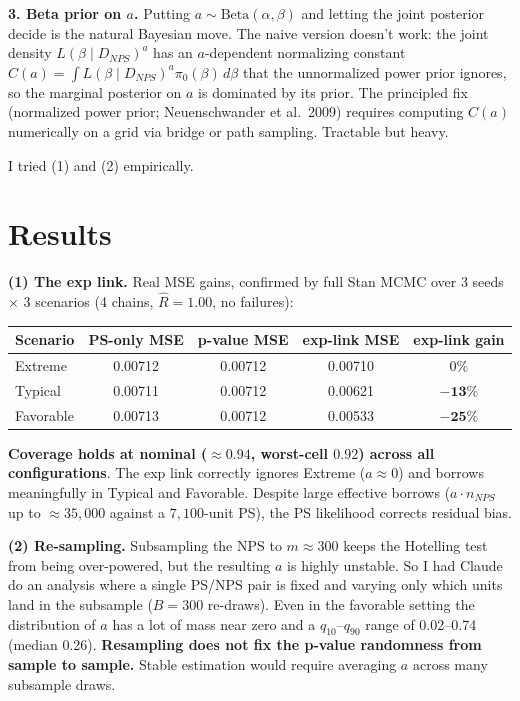 \documentclass[11pt]{article}
\begin{document}
\textbf{3. Beta prior on $a$.} Putting $a \sim \text{Beta}(\alpha, \beta)$ and letting the joint posterior decide is the natural Bayesian move. The naive version doesn't work: the joint density $L(\beta \mid D_{NPS})^a$ has an $a$-dependent normalizing constant $C(a) = \int L(\beta \mid D_{NPS})^a \pi_0(\beta)\, d\beta$ that the unnormalized power prior ignores, so the marginal posterior on $a$ is dominated by its prior. The principled fix (normalized power prior; Neuenschwander et al.\ 2009) requires computing $C(a)$ numerically on a grid via bridge or path sampling. Tractable but heavy.

I tried (1) and (2) empirically.

\section*{Results}

\textbf{(1) The exp link.} Real MSE gains, confirmed by full Stan MCMC over 3 seeds $\times$ 3 scenarios (4 chains, $\hat R = 1.00$, no failures):

\begin{center}
\begin{tabular}{lcccc}
\toprule
Scenario & PS-only MSE & p-value MSE & exp-link MSE & exp-link gain \\
\midrule
Extreme    & 0.00712 & 0.00712 & 0.00710 & $0\%$ \\
Typical    & 0.00711 & 0.00712 & 0.00621 & $\mathbf{-13\%}$ \\
Favorable  & 0.00713 & 0.00712 & 0.00533 & $\mathbf{-25\%}$ \\
\bottomrule
\end{tabular}
\end{center}

\textbf{Coverage holds at nominal ($\approx 0.94$, worst-cell $0.92$) across all configurations}. The exp link correctly ignores Extreme ($a \approx 0$) and borrows meaningfully in Typical and Favorable. Despite large effective borrows ($a \cdot n_{NPS}$ up to $\approx 35{,}000$ against a $7{,}100$-unit PS), the PS likelihood corrects residual bias.

\textbf{(2) Re-sampling.} Subsampling the NPS to $m \approx 300$ keeps the Hotelling test from being over-powered, but the resulting $a$ is highly unstable. So I had Claude do an analysis where a single PS/NPS pair is fixed and varying only which units land in the subsample ($B = 300$ re-draws). Even in the favorable setting the distribution of $a$ has a lot of mass near zero and a $q_{10}$--$q_{90}$ range of 0.02--0.74 (median 0.26). \textbf{Resampling does not fix the p-value randomness from sample to sample.} Stable estimation would require averaging $a$ across many subsample draws.
\end{document}
